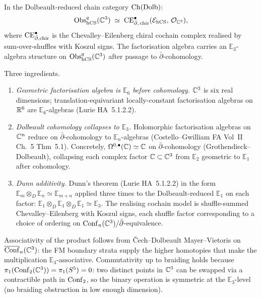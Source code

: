 \begin{theorem}\ClaimStatusTheorem
\label{opus13:thm:dunn-E3}
In the Dolbeault-reduced chain category $\mathrm{Ch}(\mathrm{Dolb})$:
\begin{equation}
  \mathrm{Obs}_{\mathrm{hCS}}^q(\mathbb{C}^3) \;\simeq\; \mathrm{CE}^\bullet_{\bar\partial,\,\mathrm{chir}}
  (\mathcal{E}_{\mathrm{hCS}},\, \mathcal{O}_{\mathbb{C}^3}),
  \label{opus13:eq:CE-realisation}
\end{equation}
where $\mathrm{CE}^\bullet_{\bar\partial,\mathrm{chir}}$ is the Chevalley--Eilenberg
chiral cochain complex realised by sum-over-shuffles with Koszul signs.
The factorisation algebra carries an $\mathbb E_3$-algebra structure on
$\mathrm{Obs}_{\mathrm{hCS}}^q(\mathbb{C}^3)$ after passage to $\bar\partial$-cohomology.
\end{theorem}

\begin{proof-sketch}
Three ingredients.
\begin{enumerate}
\item \emph{Geometric factorisation algebra is $\mathbb E_6$ before
  cohomology.} $\mathbb{C}^3$ is six real dimensions; translation-equivariant
  locally-constant factorisation algebras on $\mathbb{R}^6$ are
  $\mathbb E_6$-algebras (Lurie HA~5.1.2.2).
\item \emph{Dolbeault cohomology collapses to $\mathbb E_3$.} Holomorphic
  factorisation algebras on $\mathbb{C}^n$ reduce on $\bar\partial$-cohomology
  to $\mathbb E_n$-algebras (Costello--Gwilliam FA Vol~II Ch.~5
  Thm~5.1). Concretely, $\Omega^{0,\bullet}(\mathbb{C})\simeq\mathbb{C}$ on
  $\bar\partial$-cohomology (Grothendieck--Dolbeault), collapsing each
  complex factor $\mathbb{C} \subset \mathbb{C}^3$ from $\mathbb E_2$ geometric to
  $\mathbb E_1$ after cohomology.
\item \emph{Dunn additivity.} Dunn's theorem (Lurie HA~5.1.2.2) in the
  form $\mathbb E_m \otimes_D \mathbb E_n \simeq \mathbb E_{m+n}$ applied
  three times to the Dolbeault-reduced $\mathbb E_1$ on each factor:
  $\mathbb E_1 \otimes_D \mathbb E_1 \otimes_D \mathbb E_1
  \simeq \mathbb E_3$. The realising cochain model is shuffle-summed
  Chevalley--Eilenberg with Koszul signs, each shuffle factor
  corresponding to a choice of ordering on
  $\mathrm{Conf}_n(\mathbb{C}^3)/\bar\partial$-equivalence.
\end{enumerate}

Associativity of the product follows from \v{C}ech--Dolbeault
Mayer--Vietoris on $\overline{\mathrm{Conf}}_n(\mathbb{C}^3)$: the FM boundary strata
supply the higher homotopies that make the multiplication
$\mathbb E_3$-associative. Commutativity up to braiding holds because
$\pi_1(\mathrm{Conf}_2(\mathbb{C}^3)) = \pi_1(S^5) = 0$: two distinct points in $\mathbb{C}^3$
can be swapped via a contractible path in $\mathrm{Conf}_2$, so the binary
operation is symmetric at the $\mathbb E_3$-level (no braiding
obstruction in low enough dimension).
\end{proof-sketch}

